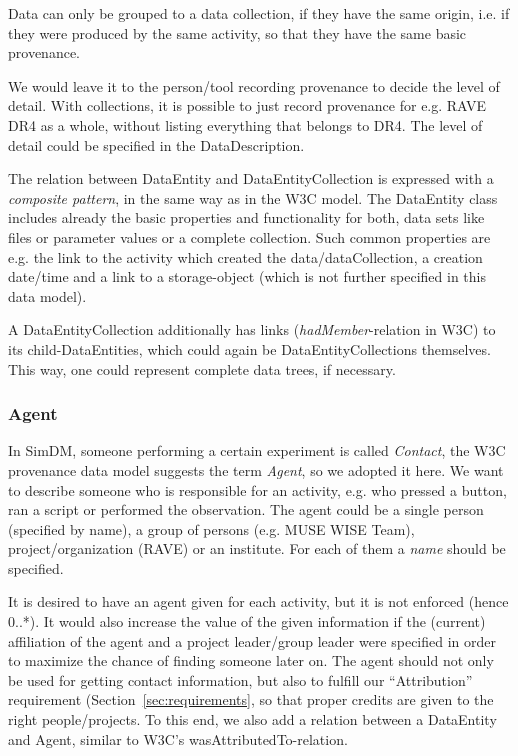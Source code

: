 Data can only be grouped to a data collection, if they have the same origin, i.e. if they were
produced by the same activity, so that they have the same basic provenance.

We would leave it to the person/tool recording provenance to decide the level of detail.
With collections, it is possible to just record provenance for e.g. RAVE DR4 as a 
whole, without listing everything that belongs to DR4. The level of detail could be specified in the  DataDescription.

The relation between DataEntity and DataEntityCollection is expressed with a \emph{composite pattern}, 
in the same way as in the W3C model. The DataEntity class includes already the basic properties and functionality for both, data sets like files or 
parameter values or a complete collection. Such common properties are e.g. the link 
to the activity which created the data/dataCollection, a creation date/time and a link to a
storage-object (which is not further specified in this data model).

A DataEntityCollection additionally has links (\emph{hadMember}-relation in W3C) to its 
child-DataEntities, which could again be DataEntityCollections themselves.
This way, one could represent complete data trees, if necessary.



\subsubsection{Agent}
In SimDM, someone performing a certain experiment is called \emph{Contact}, 
the W3C provenance data model suggests the term \emph{Agent}, so we adopted it here.
We want to describe someone who is responsible for an activity, e.g. who pressed a button, 
ran a script or performed the observation. The agent could be a single person 
(specified by name), a group of persons (e.g. MUSE WISE Team), project/organization (RAVE) or an institute. 
For each of them a \emph{name} should be specified.

It is desired to have an agent given for each activity, but it
is not enforced (hence 0..*).  It would also increase the value of the given
information if the (current) affiliation of the agent and a project leader/group
leader were specified in order to maximize the chance of finding someone later
on. The agent should not only be used for getting contact information, but also 
to fulfill our ``Attribution'' requirement (Section~\ref{sec:requirements}, 
so that proper credits are given to the right 
people/projects. To this end, we also add a 
relation between a DataEntity and Agent, similar to W3C's 
wasAttributedTo-relation.

